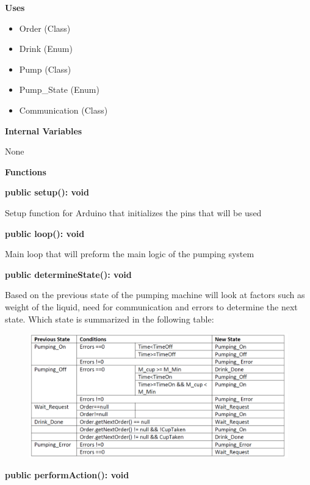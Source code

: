 \documentclass [10pt]{article}
\begin{document}
\textbf{Uses}
\begin{itemize}
	\item Order (Class)
	\item Drink (Enum)
	\item Pump (Class)
	\item Pump\_State (Enum)
	\item Communication (Class)
\end{itemize}

\textbf{Internal Variables}

 None

\textbf{Functions}

\textbf{public setup(): void}

Setup function for Arduino that initializes the pins that will be used 

\textbf{public loop(): void}

Main loop that will preform the main logic of the pumping system

\textbf{public determineState(): void}

Based on the previous state of the pumping machine will look at factors such as weight of the liquid, need for communication and errors to determine the next state. Which state is summarized in the following table:
\begin{figure} [h!]
	\centering
	\includegraphics [scale = 0.4] {figures/Pumping_DetermineState.png}
\end{figure}

\textbf{public performAction(): void}
\end{document}
